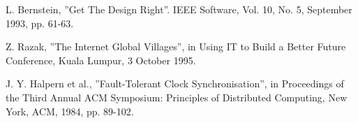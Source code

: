 \documentclass[10pt,a4paper]{mjcs}
\begin{document}
\begin{thebibliography}{10}

L. Bernstein, {''Get The Design Right''}. IEEE Software, Vol. 10, No. 5, September 1993, pp. 61-63.

Z. Razak, {''The Internet Global Villages''}, in Using IT to Build a Better Future Conference, Kuala Lumpur, 3 October 1995.

J. Y. Halpern et al., {''Fault-Tolerant Clock Synchronisation''}, in Proceedings of the Third
Annual ACM Symposium: Principles of Distributed Computing, New York, ACM, 1984, pp.
89-102.

\end{thebibliography}
\end{document}
